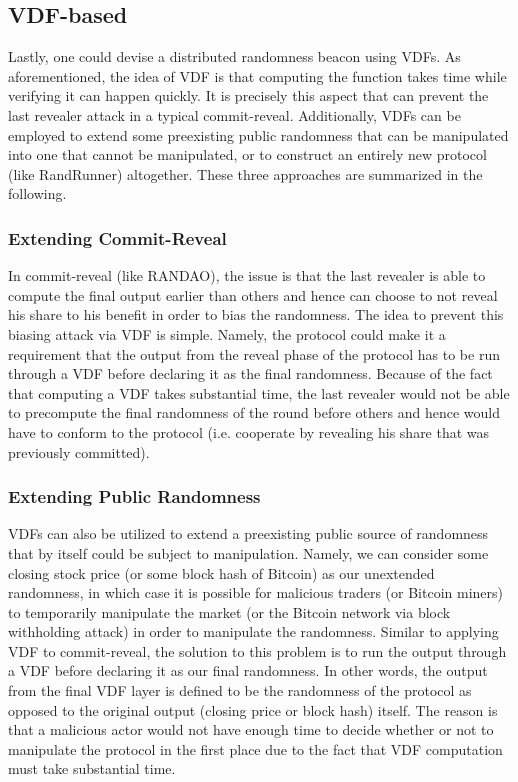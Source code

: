 \documentclass[11pt]{article}
\theoremstyle{definition}
\theoremstyle{remark}
\begin{document}

\subsection{VDF-based}
Lastly, one could devise a distributed randomness beacon using VDFs. As aforementioned, the idea of VDF is that computing the function takes time while verifying it can happen quickly. It is precisely this aspect that can prevent the last revealer attack in a typical commit-reveal. Additionally, VDFs can be employed to extend some preexisting public randomness that can be manipulated into one that cannot be manipulated, or to construct an entirely new protocol (like RandRunner) altogether. These three approaches are summarized in the following.

\subsubsection{Extending Commit-Reveal}
In commit-reveal (like RANDAO), the issue is that the last revealer is able to compute the final output earlier than others and hence can choose to not reveal his share to his benefit in order to bias the randomness. The idea to prevent this biasing attack via VDF is simple. Namely, the protocol could make it a requirement that the output from the reveal phase of the protocol has to be run through a VDF before declaring it as the final randomness. Because of the fact that computing a VDF takes substantial time, the last revealer would not be able to precompute the final randomness of the round before others and hence would have to conform to the protocol (i.e. cooperate by revealing his share that was previously committed).

\subsubsection{Extending Public Randomness}
VDFs can also be utilized to extend a preexisting public source of randomness that by itself could be subject to manipulation. Namely, we can consider some closing stock price (or some block hash of Bitcoin) as our unextended randomness, in which case it is possible for malicious traders (or Bitcoin miners) to temporarily manipulate the market (or the Bitcoin network via block withholding attack) in order to manipulate the randomness. Similar to applying VDF to commit-reveal, the solution to this problem is to run the output through a VDF before declaring it as our final randomness. In other words, the output from the final VDF layer is defined to be the randomness of the protocol as opposed to the original output (closing price or block hash) itself. The reason is that a malicious actor would not have enough time to decide whether or not to manipulate the protocol in the first place due to the fact that VDF computation must take substantial time.
\end{document}
